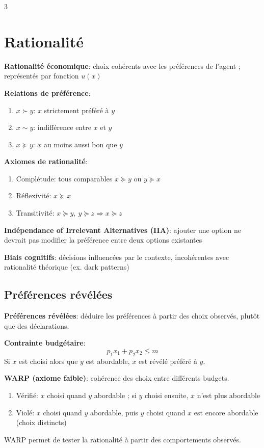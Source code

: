 \documentclass[12pt, a4paper]{article}
\begin{document}
\begin{multicols*}{3}
\section{Rationalité}

\textbf{Rationalité économique}: choix cohérents avec les préférences de l'agent ; représentés par fonction $u(x)$

\textbf{Relations de préférence}:
\begin{enumerate}[\roman*.]
  \item $x\succ y$: $x$ strictement préféré à $y$
  \item $x\sim y$: indifférence entre $x$ et $y$
  \item $x\succeq y$: $x$ au moins aussi bon que $y$
\end{enumerate}

\textbf{Axiomes de rationalité}:
\begin{enumerate}[\roman*.]
  \item Complétude: tous comparables $x\succeq y$ ou $y\succeq x$
  \item Réflexivité: 
  $x\succeq x$
  \item Transitivité: 
  $x\succeq y,\ y\succeq z\Rightarrow x\succeq z$
\end{enumerate}

\textbf{Indépendance of Irrelevant Alternatives (IIA)}: ajouter une option ne devrait pas modifier la préférence entre deux options existantes

\textbf{Biais cognitifs}: décisions influencées par le contexte, incohérentes avec rationalité théorique (ex. dark patterns)


\subsection{Préférences révélées}

\textbf{Préférences révélées}: déduire les préférences à partir des choix observés, plutôt que des déclarations.

\textbf{Contrainte budgétaire}:
\[
p_1x_1+p_2x_2\leq m
\]
Si $x$ est choisi alors que $y$ est abordable, $x$ est révélé préféré à $y$.

\textbf{WARP (axiome faible)}: cohérence des choix entre différents budgets.
\begin{enumerate}[\roman*.]
  \item Vérifié: $x$ choisi quand $y$ abordable ; si $y$ choisi ensuite, $x$ n'est plus abordable
  \item Violé: $x$ choisi quand $y$ abordable, puis $y$ choisi quand $x$ est encore abordable (choix distincts)
\end{enumerate}
WARP permet de tester la rationalité à partir des comportements observés.


\end{multicols*}
\end{document}
